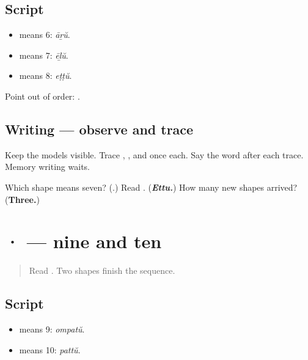 \subsection*{Script}
\begin{itemize}
\raggedright
  \item \textbf{} means 6: \emph{āṟŭ}.
  \item \textbf{} means 7: \emph{ēḻŭ}.
  \item \textbf{} means 8: \emph{eṭṭŭ}.
\end{itemize}

Point out of order: \textbf{  }.

\subsection*{Writing — observe and trace}

Keep the models visible. Trace \textbf{}, \textbf{}, and \textbf{} once each. Say the word after each trace. Memory writing waits.

\begin{tcolorbox}[breakable,colback=teal!4,colframe=teal!35!black,title={Before you move on}]
Which shape means seven? (\textbf{}.) Read \textbf{}. (\emph{\textbf{Ettu.}}) How many new shapes arrived? (\textbf{Three.})
\end{tcolorbox}
\section[\texorpdfstring{\ml{൯} \ml{൰} (nine, ten)}{൯ ൰ (nine, ten)}]{ ·  — nine and ten}

\label{lesson:ML-W07-digits-9-10}



\begin{quote}
Read \textbf{  }. Two shapes finish the sequence.
\end{quote}

\subsection*{Script}
\begin{itemize}
\raggedright
  \item \textbf{} means 9: \emph{ompatŭ}.
  \item \textbf{} means 10: \emph{pattŭ}.
\end{itemize}

